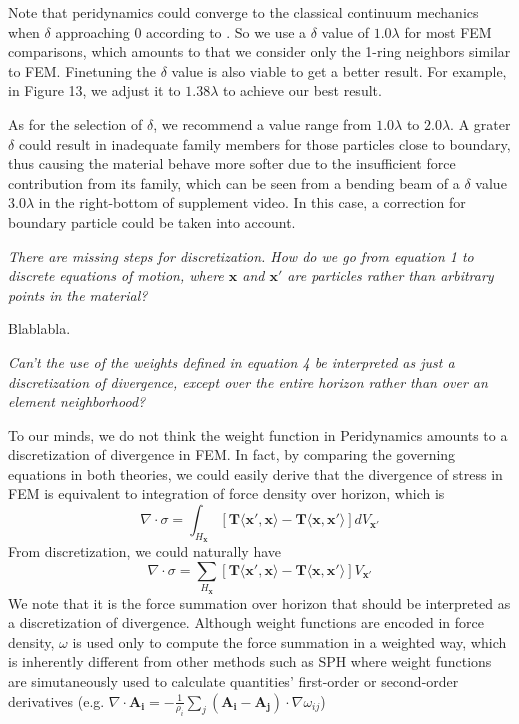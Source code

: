 Note that peridynamics could converge to the classical continuum mechanics when $\delta$ approaching 0 according to \cite{Weckner2005705}. So we use a $\delta$ value of $1.0\lambda$ for most FEM comparisons, which amounts to that we consider only the 1-ring neighbors similar to FEM. Finetuning the $\delta$ value is also viable to get a better result. For example, in Figure 13, we adjust it to $1.38\lambda$ to achieve our best result.

As for the selection of $\delta$, we recommend a value range from $1.0\lambda$ to $2.0\lambda$.
A grater $\delta$ could result in inadequate family members for those particles close to boundary, thus causing the material behave more softer due to the insufficient force contribution from its family, which can be seen from a bending beam of a $\delta$ value $3.0\lambda$ in the right-bottom of supplement video.
In this case, a correction for boundary particle could be taken into account.

\emph{There are missing steps for discretization. How do we go from equation 1 to discrete equations of motion, where $\mathbf{x}$ and $\mathbf{x'}$ are particles rather than arbitrary points in the material? }

Blablabla.

\emph{Can't the use of the weights defined in equation 4 be interpreted as just a discretization of divergence, except over the entire horizon rather than over an element neighborhood?}

To our minds, we do not think the weight function in Peridynamics amounts to a discretization of divergence in FEM.
In fact, by comparing the governing equations in both theories, we could easily derive that
the divergence of stress in FEM is equivalent to integration of force density over horizon, which is
\begin{equation}
\nabla\cdot\sigma = \int_{H_\mathbf{x}}[\mathbf{T}\langle\mathbf{x}',\mathbf{x}\rangle - \mathbf{T}\langle\mathbf{x},\mathbf{x}'\rangle]dV_{\mathbf{x}'}
\end{equation}
From discretization, we could naturally have
\begin{equation}
\nabla\cdot\sigma = \sum_{H_\mathbf{x}}[\mathbf{T}\langle\mathbf{x}',\mathbf{x}\rangle - \mathbf{T}\langle\mathbf{x},\mathbf{x}'\rangle]V_{\mathbf{x}'}
\end{equation}
We note that it is the force summation over horizon that should be interpreted as a discretization of divergence.
Although weight functions are encoded in force density, $\omega$ is used only to compute the force summation in a weighted way, which is inherently different from other methods such as SPH where weight functions are simutaneously used to calculate quantities' first-order or second-order derivatives
(e.g. $\nabla\cdot\mathbf{A_i} = -\frac{1}{\rho_i}\sum_j(\mathbf{A_i - A_j})\cdot\nabla\omega_{ij}$)


